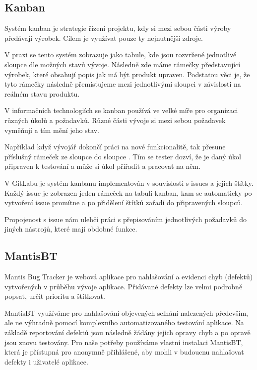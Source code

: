 \documentclass[czech,BP]{thesiskiv}
\begin{document}
\subsection{Kanban}
	\par Systém kanban je strategie řízení projektu, kdy si mezi sebou části výroby předávají výrobek. Cílem je využívat pouze ty nejnutnější zdroje.
	\par V praxi se tento systém zobrazuje jako tabule, kde jsou rozvržené jednotlivé sloupce dle možných stavů vývoje. Následně zde máme rámečky představující výrobek, které obsahují popis jak má být produkt upraven. Podstatou věci je, že tyto rámečky následně přemisťujeme mezi jednotlivými sloupci v závislosti na reálném stavu produktu.
	\par V informačních technologiích se kanban používá ve velké míře pro organizaci různých úkolů a požadavků. Různé části vývoje si mezi sebou požadavek vyměňují a tím mění jeho stav.
	\par Například když vývojář dokončí práci na nové funkcionalitě, tak přesune příslušný rámeček ze sloupce  do sloupce . Tím se tester dozví, že je daný úkol připraven k testování a může si úkol přiřadit a pracovat na něm.
	\par V GitLabu je systém kanbanu implementován v souvislosti s issues a jejich štítky. Každý issue je zobrazen jeden rámeček na tabuli kanban, kam se automaticky po vytvoření issue promítne a po přidělení štítků zařadí do připravených sloupců.
	\par Propojenost s issue nám ulehčí práci s přepisováním jednotlivých požadavků do jiných nástrojů, které mají obdobné funkce.
\subsection{MantisBT}
	\par Mantis Bug Tracker je webová aplikace pro nahlašování a evidenci chyb (defektů) vytvořených v průběhu vývoje aplikace. Přidávané defekty lze velmi podrobně popsat, určit prioritu a štítkovat.
	\par MantisBT využíváme pro nahlašování objevených selhání nalezených především, ale ne výhradně pomocí komplexního automatizovaného testování aplikace. Na základě reportování defektů jsou následně žádány jejich opravy chyb a po opravě jsou znovu testovány. Pro naše potřeby používáme vlastní instalaci MantisBT, která je přístupná pro anonymně přihlášené, aby mohli v budoucnu nahlašovat defekty i uživatelé aplikace.
\end{document}
